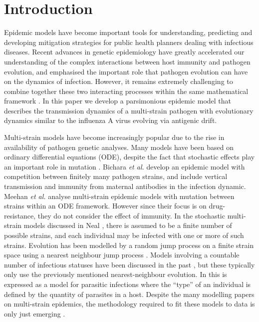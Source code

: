 \documentclass[review]{elsarticle}
\begin{document}
\linenumbers

\section{Introduction}

Epidemic models have become important tools for understanding, predicting and developing mitigation strategies for public health planners dealing with infectious diseases. Recent advances in genetic epidemiology have greatly accelerated our understanding of the complex interactions between host immunity and pathogen evolution, and emphasised the important role that pathogen evolution can have on the dynamics of infection. However, it remains extremely challenging to combine together these two interacting processes within the same mathematical framework \cite{Kucharski2016}. In this paper we develop a parsimonious epidemic model that describes the transmission dynamics of a multi-strain pathogen with evolutionary dynamics similar to the influenza A virus evolving via antigenic drift. 

Multi-strain models have become increasingly popular due to the rise in availability of pathogen genetic analyses. Many models have been based on ordinary differential equations (ODE), despite the fact that stochastic effects play an important role in mutation \citep[see][for a review]{Kucharski2016}. Bichara \emph{et al.} \cite{Bichara2014} develop an epidemic model with competition between finitely many pathogen strains, and include vertical transmission and immunity from maternal antibodies in the infection dynamic. Meehan \emph{et al.} \cite{Meehan2018} analyse multi-strain epidemic models with mutation between strains within an ODE framework. However since their focus is on drug-resistance, they do not consider the effect of immunity. In the stochastic multi-strain models discussed in Neal \cite{neal2006}, there is assumed to be a finite number of possible strains, and each individual may be infected with one or more of such strains. Evolution has been modelled by a random jump process on a finite strain space using a nearest neighbour jump process \cite{gog2002}. Models involving a countable number of infectious statuses have been discussed in the past \cite{moy1967}, but these typically only use the previously mentioned nearest-neighbour evolution. In \cite{moy1967} this is expressed as a model for parasitic infections where the ``type'' of an individual is defined by the quantity of parasites in a host.  Despite the many modelling papers on multi-strain epidemics, the methodology required to fit these models to data is only just emerging \citep{Touloupou2019}.
\end{document}
